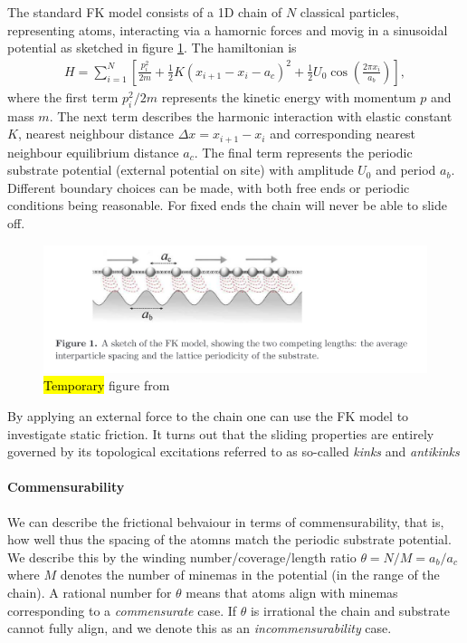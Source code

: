 The standard FK model consists of a 1D chain of $N$ classical
particles, representing atoms, interacting via a hamornic forces and movig in a
sinusoidal potential as sketched in figure \ref{fig:FK_model}. The hamiltonian
is 
\begin{align}
  H = \sum_{i=1}^N \left[\frac{p_i^2}{2m} + \frac{1}{2}K(x_{i+1} - x_i - a_c)^2 + \frac{1}{2}U_0 \cos{\left(\frac{2\pi x_i}{a_b}\right)}\right],
  \label{eq:H_FK}
\end{align}
where the first term $p_i^2/2m$ represents the kinetic energy with momentum $p$
and mass $m$. The next term describes the harmonic interaction with elastic
constant $K$, nearest neighbour distance $\Delta x = x_{i+1} - x_i$ and 
corresponding nearest neighbour equilibrium distance $a_c$. The final term represents the periodic substrate potential (external potential on site) with amplitude $U_0$ and period $a_b$. Different boundary choices can be made, with both free ends or periodic conditions being reasonable. For fixed ends the chain will never be able to slide off. 




\begin{figure}[H]
  \centering
  \includegraphics[width=0.8\linewidth]{figures/theory/FK_model.png}
  \caption{\hl{Temporary} figure from \cite{Manini_2016}}
  \label{fig:FK_model}
\end{figure}

By applying an external force to the chain one can use the FK model to
investigate static friction. It turns out that the sliding properties are entirely governed by its topological excitations referred to as so-called \textit{kinks} and \textit{antikinks}

\paragraph*{Commensurability} We can describe the frictional behvaiour in terms of commensurability, that is, how well thus the spacing of the atomns match the periodic substrate potential. We describe this by the winding number/coverage/length ratio $\theta = N / M = a_b / a_c$ where $M$ denotes the number of minemas in the potential (in the range of the chain). A rational number for $\theta$ means that atoms align with minemas corresponding to a \textit{commensurate} case. If $\theta$ is irrational the chain and substrate cannot fully align, and we denote this as an \textit{incommensurability} case.


